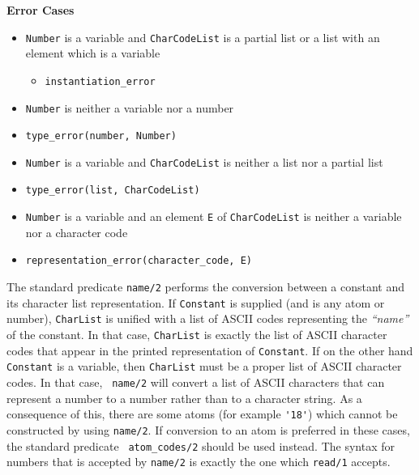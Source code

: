 \begin{description}
{\bf Error Cases}
\begin{itemize}
\item {\tt Number} is a variable and {\tt CharCodeList} is a partial
  list or a list with an element which is a variable
\begin{itemize}
\item {\tt instantiation\_error}
\end{itemize}
\item {\tt Number} is neither a variable nor a number
\bi
\item {\tt type\_error(number, Number)}
\ei
\item {\tt Number} is a variable and {\tt CharCodeList} is neither a
  list nor a partial list 
\bi
\item {\tt type\_error(list, CharCodeList)}
\ei
\item {\tt Number} is a variable and an element {\tt E} of {\tt CharCodeList} is neither a
variable nor a character code
\bi
\item {\tt representation\_error(character\_code, E)}
\ei
\end{itemize}

%
The standard predicate {\tt name/2} performs the conversion between a
constant and its character list representation.  If {\tt Constant} is
supplied (and is any atom or number), {\tt CharList} is unified with a
list of ASCII codes representing the {\em ``name''} of the constant.
In that case, {\tt CharList} is exactly the list of ASCII character
codes that appear in the printed representation of {\tt Constant}\@.
If on the other hand {\tt Constant} is a variable, then {\tt CharList}
must be a proper list of ASCII character codes.  In that case, {\tt
  name/2} will convert a list of ASCII characters that can represent a
number to a number rather than to a character string.  As a
consequence of this, there are some atoms (for example \verb|'18'|)
which cannot be constructed by using {\tt name/2}\@.  If conversion to
an atom is preferred in these cases, the standard predicate {\tt
  atom\_codes/2} should be used instead. The syntax for numbers that
is accepted by {\tt name/2} is exactly the one which {\tt read/1}
accepts.  



\end{description}
